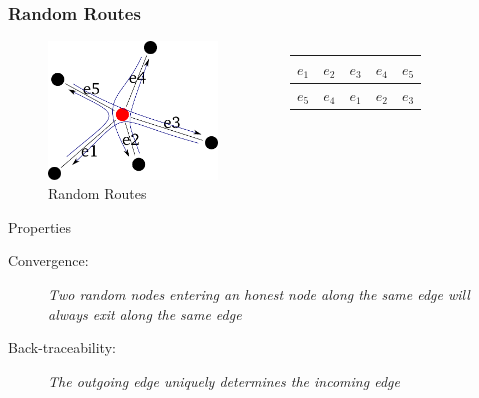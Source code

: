 \documentclass{beamer}
\begin{document}
\begin{frame}

  \frametitle{Random Routes}

  \begin{figure}
    \begin{columns}
      \begin{column}{4.5cm}
	\includegraphics[width=4.5cm]{./pictures/random_route} 
      \end{column}
      \begin{column}{3cm}
	\begin{center}
	  \begin{tabular}{|c|c|c|c|c|}
	    \hline
	    $e_1$ & $e_2$ & $e_3$ & $e_4$ & $e_5$ \\
	    \hline
	    $e_5$ & $e_4$ & $e_1$ & $e_2$ & $e_3$ \\
	    \hline
	  \end{tabular}
	\end{center}
      \end{column}
    \end{columns}

    \caption{Random Routes}
  \end{figure}

  \begin{block}{Properties}
    \begin{description}
      \item[Convergence:] {\small \emph{Two random nodes entering an honest node along the same edge will always exit along the same edge}}
      \item[Back-traceability:] {\small \emph{The outgoing edge uniquely determines the incoming edge}}
    \end{description}
  \end{block}

\end{frame}

\end{document}
